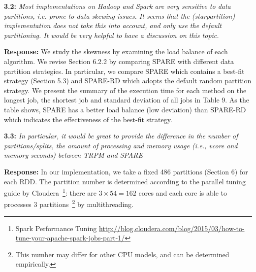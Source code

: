 \textbf{3.2:} \emph{Most implementations
on Hadoop and Spark are very sensitive to data partitions, i.e. prone to data
skewing issues. It seems that the (starpartition)
implementation does not take
this into account, and only use the default partitioning. It would be very helpful
to have a discussion on this topic.}

\textbf{Response:}  We study the skewness by examining the load balance of each algorithm.
We revise Section 6.2.2 by comparing SPARE with different data partition strategies.
In particular, we compare SPARE which contains a best-fit strategy (Section 5.3) and SPARE-RD
which adopts the default random partition strategy.
We present the summary of the execution time for each method on the longest job, the shortest job and standard
deviation of all jobs in Table 9. As the table shows, SPARE has a better load balance (low deviation)
than SPARE-RD which indicates the effectiveness of the best-fit strategy. 




\textbf{3.3:} \emph{In particular, it would be great to provide the
difference in the number of partitions/splits, the amount of processing and
memory usage (i.e., vcore and memory seconds) between TRPM and SPARE}

\textbf{Response:} In our implementation, we take a fixed 486 partitions (Section 6)
for each RDD. The partition number is determined according to
the parallel tuning guide by Cloudera~\footnote{Spark Performance Tuning \url{http://blog.cloudera.com/blog/2015/03/how-to-tune-your-apache-spark-jobs-part-1/}}: there are  $3\times 54=162$ cores and each core is able to processes 3 partitions~\footnote{This number may differ for other CPU models, and can be determined empirically.}
by multithreading.


